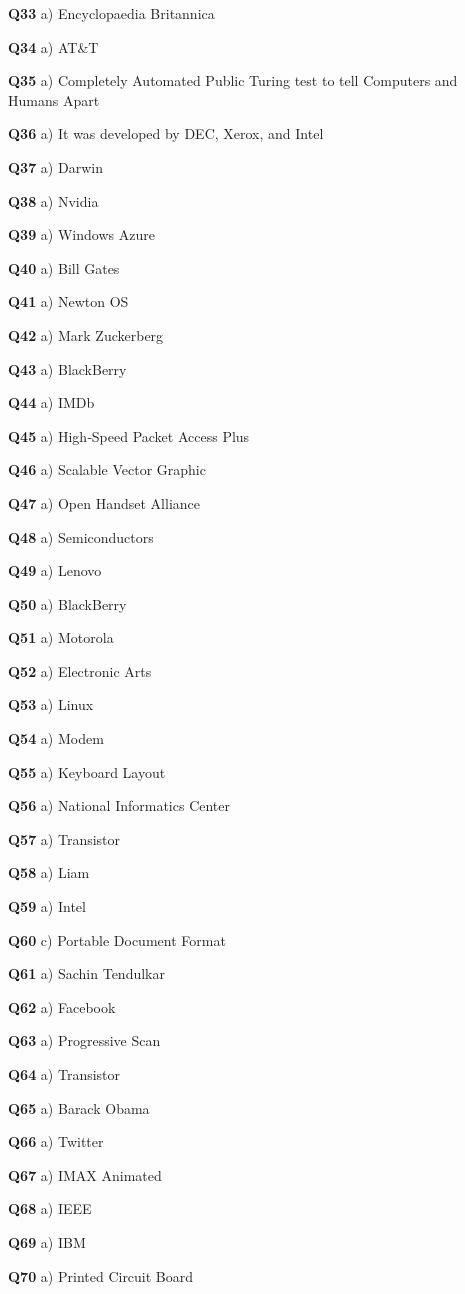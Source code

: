 \textbf{Q33} a) Encyclopaedia Britannica\par
\textbf{Q34} a) AT&T\par
\textbf{Q35} a) Completely Automated Public Turing test to tell Computers and Humans Apart\par
\textbf{Q36} a) It was developed by DEC, Xerox, and Intel\par
\textbf{Q37} a) Darwin\par
\textbf{Q38} a) Nvidia\par
\textbf{Q39} a) Windows Azure\par
\textbf{Q40} a) Bill Gates\par
\textbf{Q41} a) Newton OS\par
\textbf{Q42} a) Mark Zuckerberg\par
\textbf{Q43} a) BlackBerry\par
\textbf{Q44} a) IMDb\par
\textbf{Q45} a) High‑Speed Packet Access Plus\par
\textbf{Q46} a) Scalable Vector Graphic\par
\textbf{Q47} a) Open Handset Alliance\par
\textbf{Q48} a) Semiconductors\par
\textbf{Q49} a) Lenovo\par
\textbf{Q50} a) BlackBerry\par
\textbf{Q51} a) Motorola\par
\textbf{Q52} a) Electronic Arts\par
\textbf{Q53} a) Linux\par
\textbf{Q54} a) Modem\par
\textbf{Q55} a) Keyboard Layout\par
\textbf{Q56} a) National Informatics Center\par
\textbf{Q57} a) Transistor\par
\textbf{Q58} a) Liam\par
\textbf{Q59} a) Intel\par
\textbf{Q60} c) Portable Document Format\par
\textbf{Q61} a) Sachin Tendulkar\par
\textbf{Q62} a) Facebook\par
\textbf{Q63} a) Progressive Scan\par
\textbf{Q64} a) Transistor\par
\textbf{Q65} a) Barack Obama\par
\textbf{Q66} a) Twitter\par
\textbf{Q67} a) IMAX Animated\par
\textbf{Q68} a) IEEE\par
\textbf{Q69} a) IBM\par
\textbf{Q70} a) Printed Circuit Board\par
